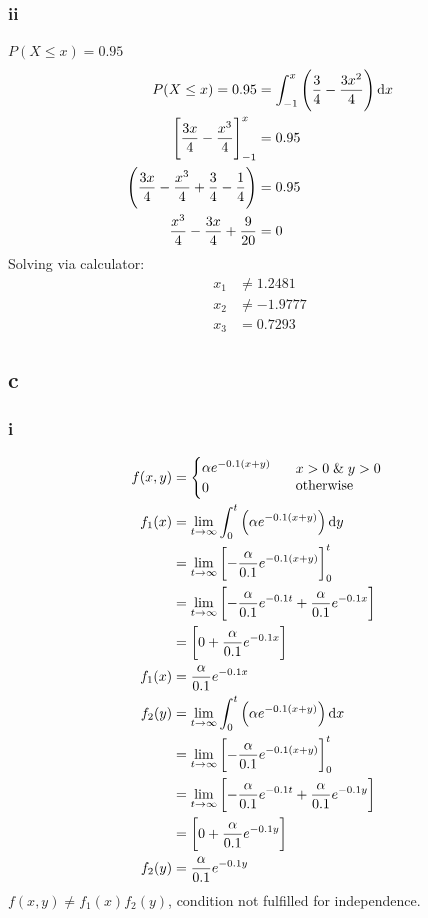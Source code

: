 \documentclass[11pt]{article}
\numberwithin{equation}{section}
\begin{document}
\subsubsection{ii}
$P(X \leq x) = 0.95$
\begin{align}
    P(X \leq x) = 0.95 &= \int_{-1}^{x} \left(\frac{3}{4} - \frac{3x^2}{4}\right) \dif x\\
    \left[\frac{3x}{4} - \frac{x^3}{4}\right]_{-1}^{x} &= 0.95 \\
    \left(\frac{3x}{4} - \frac{x^3}{4} + \frac{3}{4} - \frac{1}{4} \right) &= 0.95\\
    \frac{x^3}{4} -\frac{3x}{4} + \frac{9}{20} &= 0
\end{align}
Solving via calculator:
\begin{align}
    x_1 &\neq 1.2481\\
    x_2 &\neq -1.9777\\
    x_3 &= 0.7293
\end{align}
\subsection{c}
\subsubsection{i}
\begin{align}
    f(x,y) &= \begin{cases}
        \alpha e^{-0.1\left(x+y\right)}\\
        0 
    \end{cases} \begin{array}{l}
        x > 0 \; \& \; y > 0 \\
        \textrm{otherwise}
    \end{array}\\
    f_1(x) &= \lim_{t\rightarrow \infty} \int_0^t \left(\alpha e^{-0.1\left(x+y\right)} \right) \dif y\\
    &= \lim_{t\rightarrow \infty} \left[-\frac{\alpha}{0.1} e^{-0.1\left(x+y\right)}\right]_0^t\\
    &= \lim_{t\rightarrow \infty} \left[-\frac{\alpha}{0.1} e^{-0.1t} + \frac{\alpha}{0.1} e^{-0.1x}\right]\\
    &= \left[0 + \frac{\alpha}{0.1} e^{-0.1x}\right]\\
    f_1(x) &= \frac{\alpha}{0.1} e^{-0.1x}\\
    f_2(y) &= \lim_{t\rightarrow \infty} \int_0^t \left(\alpha e^{-0.1\left(x+y\right)} \right) \dif x\\
    &= \lim_{t\rightarrow \infty} \left[-\frac{\alpha}{0.1} e^{-0.1\left(x+y\right)}\right]_0^t\\
    &= \lim_{t\rightarrow \infty} \left[-\frac{\alpha}{0.1} e^{-0.1t} + \frac{\alpha}{0.1} e^{-0.1y}\right]\\
    &= \left[0 + \frac{\alpha}{0.1} e^{-0.1y}\right]\\
    f_2(y) &= \frac{\alpha}{0.1} e^{-0.1y}
\end{align}
$f(x,y) \neq f_1(x)f_2(y)$, condition not fulfilled for independence.
\end{document}

